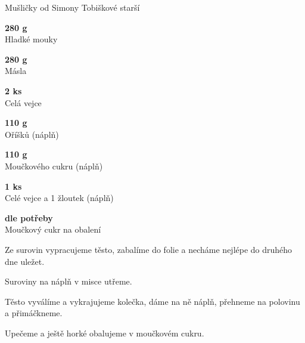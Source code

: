 \documentclass[11pt,a4paper]{article}
\begin{document}
\begin{recipe}[HotPink]{Mušličky od Simony Tobiškové starší}
    \begin{ingredients}
        \item \parbox[t]{\linewidth}{\raggedright \weight \textbf{280 g}\\ Hladké mouky}
        \item \parbox[t]{\linewidth}{\raggedright \weight \textbf{280 g}\\ Másla}
        \item \parbox[t]{\linewidth}{\raggedright \piece \textbf{2 ks}\\ Celá vejce}
        \item \parbox[t]{\linewidth}{\raggedright \weight \textbf{110 g}\\ Oříšků (náplň)}
        \item \parbox[t]{\linewidth}{\raggedright \weight \textbf{110 g}\\ Moučkového cukru (náplň)}
        \item \parbox[t]{\linewidth}{\raggedright \piece \textbf{1 ks}\\ Celé vejce a 1 žloutek (náplň)}
        \item \parbox[t]{\linewidth}{\raggedright \indefinite \textbf{dle potřeby}\\ Moučkový cukr na obalení}
    \end{ingredients}
    \begin{steps}
        \item Ze surovin vypracujeme těsto, zabalíme do folie a necháme nejlépe do druhého dne uležet.
        \item Suroviny na náplň v misce utřeme.
        \item Těsto vyválíme a vykrajujeme kolečka, dáme na ně náplň, přehneme na polovinu a přimáčkneme.
        \item Upečeme a ještě horké obalujeme v moučkovém cukru.
    \end{steps}
\end{recipe}
\end{document}
